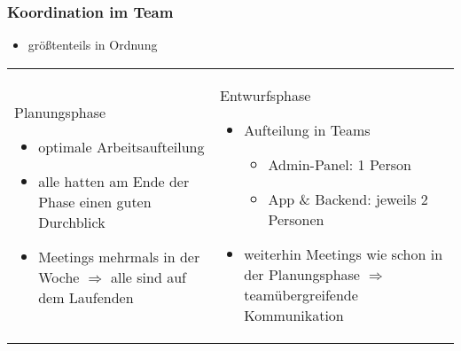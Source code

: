 \begin{frame}\frametitle{Koordination im Team}
    \begin{itemize}
        \item größtenteils in Ordnung
    \end{itemize}
        	\begin{tabular}{l l}
        	\begin{tcolorbox}[width=.4\textwidth]
        	Planungsphase
        	\begin{itemize}
        		\item optimale Arbeitsaufteilung
        		\item alle hatten am Ende der Phase einen guten Durchblick
        		\item Meetings mehrmals in der Woche $\Rightarrow$ alle sind auf dem Laufenden
        	\end{itemize}
        	\end{tcolorbox} &
        	\begin{tcolorbox}[width=.5\textwidth]
        	Entwurfsphase
        	\begin{itemize}
        		\item Aufteilung in Teams
        		\begin{itemize}
        			\item Admin-Panel: 1 Person
        			\item App \& Backend: jeweils 2 Personen
        		\end{itemize}
        	\item weiterhin Meetings wie schon in der Planungsphase $\Rightarrow$ teamübergreifende Kommunikation
     	\end{itemize}
        	\end{tcolorbox} \\
        	\end{tabular}
\end{frame}

